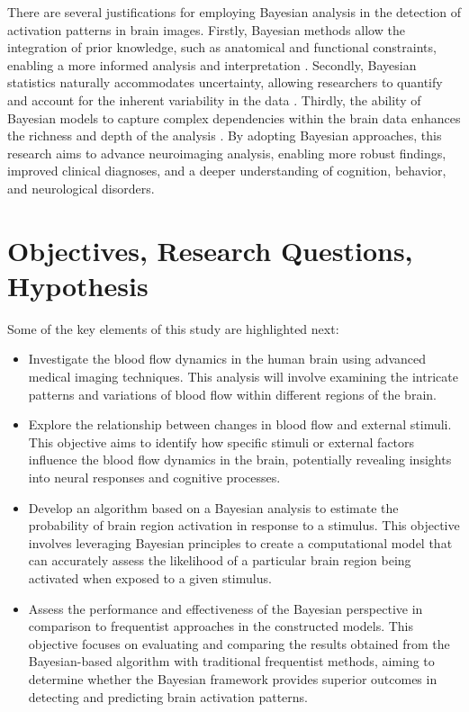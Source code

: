 There are several justifications for employing Bayesian analysis in the detection of activation patterns in brain images. Firstly, Bayesian methods allow the integration of prior knowledge, such as anatomical and functional constraints, enabling a more informed analysis and interpretation \cite{poline1997combining}. Secondly, Bayesian statistics naturally accommodates uncertainty, allowing researchers to quantify and account for the inherent variability in the data \cite{mclntosh1994structural}. Thirdly, the ability of Bayesian models to capture complex dependencies within the brain data enhances the richness and depth of the analysis \cite{beckmann2003general}. By adopting Bayesian approaches, this research aims to advance neuroimaging analysis, enabling more robust findings, improved clinical diagnoses, and a deeper understanding of cognition, behavior, and neurological disorders.

\section{Objectives, Research Questions, Hypothesis}

\noindent Some of the key elements of this study are highlighted next:
\begin{itemize}
\item Investigate the blood flow dynamics in the human brain using advanced medical imaging techniques. This analysis will involve examining the intricate patterns and variations of blood flow within different regions of the brain.
\item Explore the relationship between changes in blood flow and external stimuli. This objective aims to identify how specific stimuli or external factors influence the blood flow dynamics in the brain, potentially revealing insights into neural responses and cognitive processes.
\item Develop an algorithm based on a Bayesian analysis to estimate the probability of brain region activation in response to a stimulus. This objective involves leveraging Bayesian principles to create a computational model that can accurately assess the likelihood of a particular brain region being activated when exposed to a given stimulus.
\item Assess the performance and effectiveness of the Bayesian perspective in comparison to frequentist approaches in the constructed models. This objective focuses on evaluating and comparing the results obtained from the Bayesian-based algorithm with traditional frequentist methods, aiming to determine whether the Bayesian framework provides superior outcomes in detecting and predicting brain activation patterns.
\end{itemize}
	
